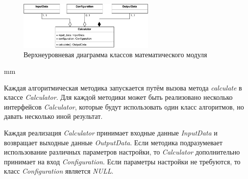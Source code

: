 \begin{figure}[H]
	\includegraphics[width=0.6\textwidth, left]{architecture/pictures/math/classes}
	\caption{Верхнеуровневая диаграмма классов математического модуля}
	\label{pic:architecture__math-classes}
\end{figure}
 mm

Каждая алгоритмическая методика запускается путём вызова метода \textit{calculate}
в классе \textit{Calculator}.
Для каждой методики может быть реализовано несколько интерфейсов \textit{Calculator},
которые будут использовать один класс алгоритмов, но давать несколько иной результат.

Каждая реализация \textit{Calculator} принимает входные данные \textit{InputData}
и возвращает выходные данные \textit{OutputData}.
Если методика подразумевает использование различных параметров настройки, то \textit{Calculator} дополнительно
принимает на вход \textit{Configuration}. Если параметры настройки не требуются, то класс \textit{Configuration}
является \textit{NULL}.
